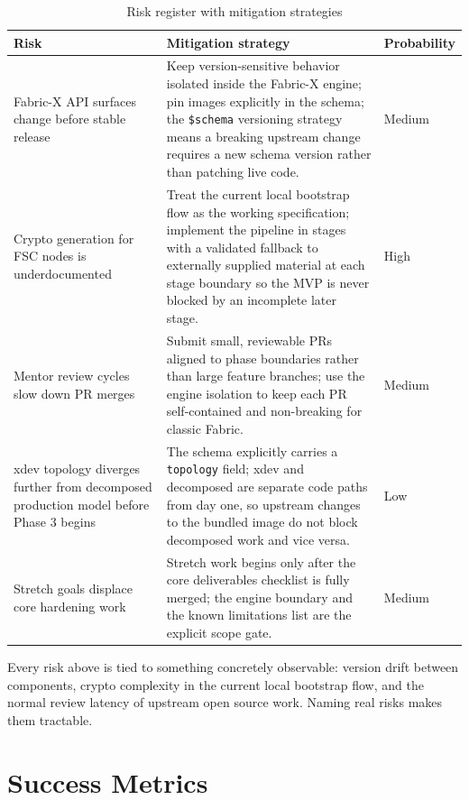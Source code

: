 \begin{table}[h]
\centering
\begin{tabularx}{\textwidth}{|p{3cm}|X|p{2cm}|}
\hline
\textbf{Risk} & \textbf{Mitigation strategy} & \textbf{Probability} \\
\hline
Fabric-X API surfaces change before stable release &
Keep version-sensitive behavior isolated inside
the Fabric-X engine; pin images explicitly
in the schema; the \texttt{\$schema} versioning
strategy means a breaking upstream change requires
a new schema version rather than patching live code. &
Medium \\
\hline
Crypto generation for FSC nodes is underdocumented &
Treat the current local bootstrap flow as the working
specification; implement the pipeline in stages with
a validated fallback to externally supplied material
at each stage boundary so the MVP is never blocked
by an incomplete later stage. &
High \\
\hline
Mentor review cycles slow down PR merges &
Submit small, reviewable PRs aligned to phase
boundaries rather than large feature branches;
use the engine isolation to keep each PR
self-contained and non-breaking for classic Fabric. &
Medium \\
\hline
xdev topology diverges further from decomposed
production model before Phase 3 begins &
The schema explicitly carries a \texttt{topology}
field; xdev and decomposed are separate code paths
from day one, so upstream changes to the bundled
image do not block decomposed work and vice versa. &
Low \\
\hline
Stretch goals displace core hardening work &
Stretch work begins only after the core deliverables
checklist is fully merged; the engine boundary and
the known limitations list are the explicit
scope gate. &
Medium \\
\hline
\end{tabularx}
\caption{Risk register with mitigation strategies}
\label{tab:risks}
\end{table}

Every risk above is tied to something concretely observable:
version drift between components, crypto complexity in the
current local bootstrap flow, and the normal review latency
of upstream open source work. Naming real risks makes them tractable.

\section{Success Metrics}

